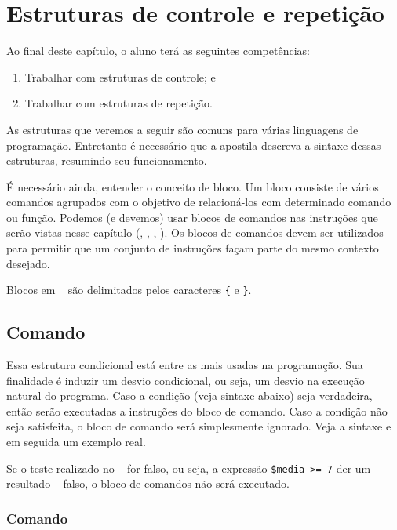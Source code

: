 \chapter{Estruturas de controle e repetição}

Ao final deste capítulo, o aluno terá as seguintes competências:
\begin{enumerate}
    \item Trabalhar com estruturas de controle; e 
    \item Trabalhar com estruturas de repetição.
\end{enumerate}

As estruturas que veremos a seguir são comuns para várias linguagens de programação.
Entretanto é necessário que a apostila descreva a sintaxe dessas estruturas, resumindo
seu funcionamento.

É necessário ainda, entender o conceito de bloco. Um bloco consiste de vários
comandos agrupados com o objetivo de relacioná-los com determinado comando
ou função. Podemos (e devemos) usar blocos de comandos nas instruções que serão
vistas nesse capítulo (\comandoif, \comandofor, \comandowhile, \comandoswitch).
Os blocos de comandos devem ser utilizados para permitir que um conjunto de instruções
façam parte do mesmo contexto desejado.

Blocos em \php~ são delimitados pelos caracteres \texttt{\{} e \texttt{\}}.

\section{Comando \comandoif}
\label{comando-if}

Essa estrutura condicional está entre as mais usadas na programação. Sua finalidade é induzir um 
desvio condicional, ou seja, um desvio na execução natural do programa. Caso a condição (veja sintaxe abaixo) 
seja verdadeira, então serão executadas a instruções do bloco de comando. 
Caso a condição não seja satisfeita, o bloco de comando será simplesmente ignorado. 
Veja a sintaxe e em seguida um exemplo real.



Se o teste realizado no \comandoif~ for falso, ou seja, a expressão \texttt{\$media >= 7} der um
resultado \booleano~ falso, o bloco de comandos não será executado.

\subsection{Comando \comandoifelse}
\label{comando-if-else}

